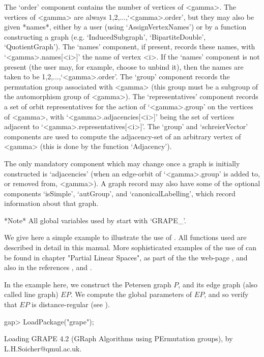 The `order' component contains the number of vertices of <gamma>. The
vertices of <gamma> are always 1,2,...,`<gamma>.order', but they may also
be given *names*, either by a user (using `AssignVertexNames') or by a
function constructing a graph (e.g. `InducedSubgraph', `BipartiteDouble',
`QuotientGraph'). The `names' component, if present, records these
names, with `<gamma>.names[<i>]' the name of vertex <i>.  If the `names'
component is not present (the user may, for example, choose to unbind
it), then the names are taken to be 1,2,...,`<gamma>.order'. The `group'
component records the {\GAP} permutation group associated with <gamma>
(this group must be a subgroup of the automorphism group of <gamma>). The
`representatives' component records a set of orbit representatives
for the action of `<gamma>.group' on the vertices of <gamma>, with
`<gamma>.adjacencies[<i>]' being the set of vertices adjacent to
`<gamma>.representatives[<i>]'. The `group' and `schreierVector'
components are used to compute the adjacency-set of an arbitrary vertex
of <gamma> (this is done by the function `Adjacency').

The only mandatory component which may change once a graph is initially
constructed is `adjacencies' (when an edge-orbit of `<gamma>.group' is
added to, or removed from, <gamma>). A graph record may also have some
of the optional components `isSimple', `autGroup', and
`canonicalLabelling', which record information about that graph.

*Note* All global variables used by {\GRAPE} start with `GRAPE\_'.


We give here a simple example to illustrate the use of {\GRAPE}. All
functions used are described in detail in this manual. More
sophisticated examples of the use of {\GRAPE} can be found in
chapter "Partial Linear Spaces", as part of the the web-page
, and also 
in the references \cite{Cam99}, \cite{CSS99} and \cite{HL99}.

In the example here, we construct the Petersen graph $P$, and its edge
graph (also called line graph) $EP$. We compute the global parameters
of $EP$, and so verify that $EP$ is distance-regular (see \cite{BCN89}).

\beginexample
gap> LoadPackage("grape");

Loading  GRAPE 4.2  (GRaph Algorithms using PErmutation groups),
by L.H.Soicher@qmul.ac.uk.

